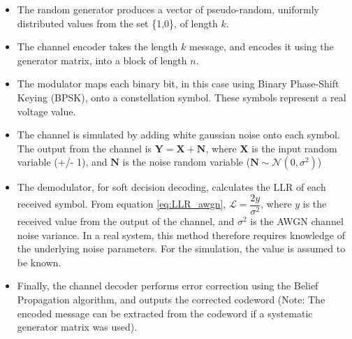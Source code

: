 \documentclass[11pt]{article}
\numberwithin{equation}{subsection}
\begin{document}
\begin{itemize}
\item The random generator produces a vector of pseudo-random, uniformly distributed values from the set \{1,0\}, of length $k$.
\item The channel encoder takes the length $k$ message, and encodes it using the generator matrix, into a block of length $n$.
\item The modulator maps each binary bit, in this case using Binary Phase-Shift Keying (BPSK), onto a constellation symbol. These symbols represent a real voltage value.
\item The channel is simulated by adding white gaussian noise onto each symbol. The output from the channel is $\mathbf{Y = X + N}$, where $\mathbf{X}$ is the input random variable (+/- 1), and $\mathbf{N}$ is the noise random variable ($\mathbf{N} \sim \mathcal{N}(0,\sigma^2)$)
\item The demodulator, for soft decision decoding, calculates the LLR of each received symbol. From equation \ref{eq:LLR_awgn}, $\mathcal{L} = \dfrac{2y}{\sigma^2}$, where $y$ is the received value from the output of the channel, and $\sigma^2$ is the AWGN channel noise variance. In a real system, this method therefore requires knowledge of the underlying noise parameters. For the simulation, the value is assumed to be known.
\item Finally, the channel decoder performs error correction using the Belief Propagation algorithm, and outputs the corrected codeword (Note: The encoded message can be extracted from the codeword if a systematic generator matrix was used).
\end{itemize}
\end{document}
